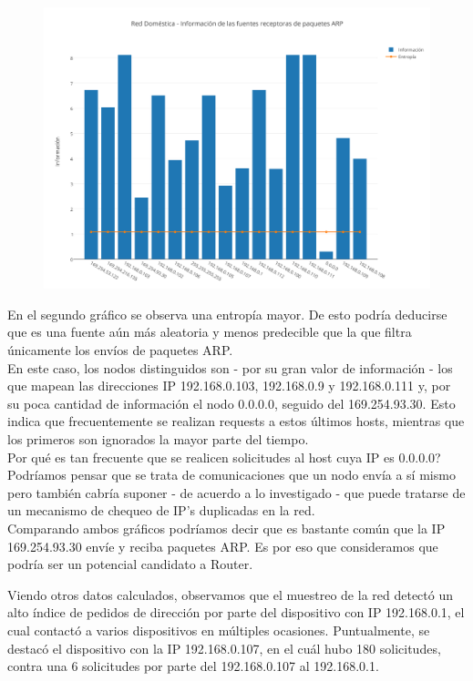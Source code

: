 \begin{figure}[h!]
    \centering                                                       
    \includegraphics[width=400pt]{img/RedDomesticaFuentesReceptorasARP}
    \caption{}
    \label{domesticaReceptoras}
\end{figure}

En el segundo gr\'afico se observa una entrop\'ia mayor. De esto podr\'ia deducirse que es una fuente a\'un m\'as aleatoria y menos predecible que la que filtra \'unicamente los env\'ios de paquetes ARP.\\
En este caso, los nodos distinguidos son - por su gran valor de informaci\'on - los que mapean las direcciones IP 192.168.0.103, 192.168.0.9 y 192.168.0.111 y, por su poca cantidad de informaci\'on el nodo 0.0.0.0, seguido del 169.254.93.30. Esto indica que frecuentemente se realizan requests a estos \'ultimos hosts, mientras que los primeros son ignorados la mayor parte del tiempo. \\

Por qu\'e es tan frecuente que se realicen solicitudes al host cuya IP es 0.0.0.0? Podr\'iamos pensar que se trata de comunicaciones que un nodo env\'ia a s\'i mismo pero tambi\'en cabr\'ia suponer - de acuerdo a lo investigado - que puede tratarse de un mecanismo de chequeo de IP's duplicadas en la red.\\

Comparando ambos gr\'aficos podr\'iamos decir que es bastante com\'un que la IP 169.254.93.30 env\'ie y reciba paquetes ARP. Es por eso que consideramos que podr\'ia ser un potencial candidato a Router.

Viendo otros datos calculados, observamos que el muestreo de la red detect\'o un alto \'indice de pedidos de direcci\'on por parte del dispositivo con IP 192.168.0.1, el cual contact\'o a varios dispositivos en m\'ultiples ocasiones. Puntualmente, se destac\'o el dispositivo con la IP 192.168.0.107, en el cu\'al hubo 180 solicitudes, contra una 6 solicitudes por parte del 192.168.0.107 al 192.168.0.1.

